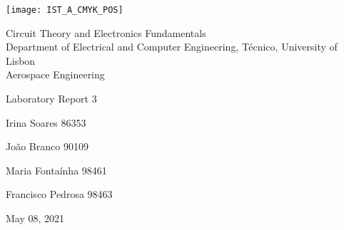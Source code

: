 
\thispagestyle {empty}

\texttt{[image: IST\_A\_CMYK\_POS]}

\begin{center}
%
\vspace{1.0cm}

\vspace{1cm}
{\FontLb Circuit Theory and Electronics Fundamentals} \\ %
\vspace{1cm}
{\FontSn Department of Electrical and Computer Engineering, Técnico, University of Lisbon} \\ %
\vspace{1cm}
{\FontSn Aerospace Engineering}


\vspace{1cm}
{\FontSn Laboratory Report 3} \\


\vspace{1cm}


{Irina Soares 86353}


\vspace{2mm}
{João Branco 90109}


\vspace{2mm}
{Maria Fontaínha 98461}


\vspace{2mm}
{Francisco Pedrosa 98463 }
\vspace{1cm}


{\FontSn May 08, 2021} \\ %
%
\end{center}
